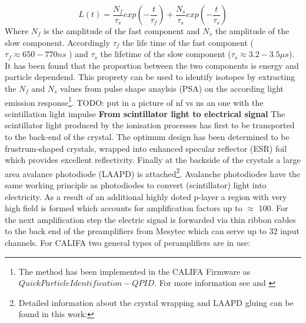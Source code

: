 \begin{equation}
L(t) = \frac{N_f}{\tau_s} exp(-\frac{t}{\tau_f}) + \frac{N_s}{\tau_s} exp(-\frac{t}{\tau_s})
\end{equation}
Where $N_{f}$ is the amplitude of the fast component and $N_{s}$ the amplitude of the slow component. Accordingly $\tau_{f}$ the life time of the fast component ($\tau_{f} \approx 650-770 ns$ ) and $\tau_{s}$ the lifetime of the slow component ($\tau_{s} \approx 3.2 - 3.5\mu s$). It has been found that the proportion between the two components is energy and particle dependend. This proprety can be used to identify isotopes by extracting the $N_{f}$ and $N_{s}$ values from pulse shape anaylsis (PSA) on the according light emission response\footnote{The method has been implemented in the CALIFA Firmware as $Quick Particle Identification -QPID$. For more information see \cite{winkel2011implementierung} and \cite{winkel2016komplexe}}.  
TODO: put in a picture of nf vs ns an one with the scintillation light impulse\newline
\textbf{From scintillator light to electrical signal}\newline
The scintillator light produced by the ionisation processes  has first to be transported to the back-end of the crystal. The optimum design has been determined to be frustrum-shaped crystals, wrapped into enhanced specular reflector (ESR) foil which provides excellent reflectivity. Finally at the backside of the crystals a large area avalance photodiode (LAAPD) is attached\footnote{Detailed information about the crystal wrapping and LAAPD gluing can be found in this work:\cite{hartigevolution}}. Avalanche photodiodes have the same working principle as photodiodes to convert (scintillator) light into electricity. As a result of an additional highly doted p-layer a region with very high field is formed which accounts for amplification factors up to $\approx$ 100.\newline
For the next amplification step the  electric signal is forwarded via thin ribbon cables to the back end of the preamplifiers from Mesytec\cite{mesytec-home} which can serve up to 32 input channels. For CALIFA two general types of peramplifiers are in use:
